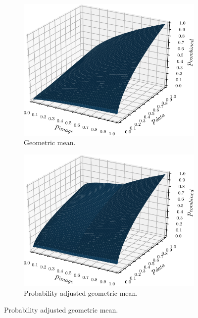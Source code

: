 \begin{figure}[t!]
	\centering
	\begin{subfigure}[b]{0.49\textwidth}
		\centering
		\includegraphics[width=\textwidth,keepaspectratio]{images/elicitation/combined_plot_non_extreme-cropped.pdf}
		\caption{Geometric mean.}
		\label{fig:gmean_normal}
	\end{subfigure}
	\hfill
	\begin{subfigure}[b]{0.49\textwidth}
		\centering
		\includegraphics[width=\textwidth,keepaspectratio]{images/elicitation/combined_plot_less_extreme-cropped.pdf}
		\caption{Probability adjusted geometric mean.}
		\label{fig:gmean_adjusted}
	\end{subfigure}

\end{figure}
